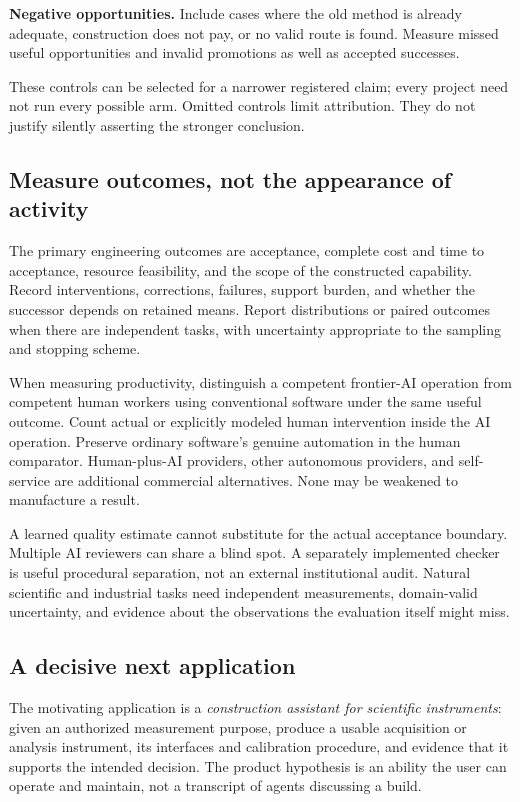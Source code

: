 \textbf{Negative opportunities.} Include cases where the old method is already adequate, construction does not pay, or no valid route is found. Measure missed useful opportunities and invalid promotions as well as accepted successes.

These controls can be selected for a narrower registered claim; every project need not run every possible arm. Omitted controls limit attribution. They do not justify silently asserting the stronger conclusion.

\subsection{Measure outcomes, not the appearance of activity}

The primary engineering outcomes are acceptance, complete cost and time to acceptance, resource feasibility, and the scope of the constructed capability. Record interventions, corrections, failures, support burden, and whether the successor depends on retained means. Report distributions or paired outcomes when there are independent tasks, with uncertainty appropriate to the sampling and stopping scheme.

When measuring productivity, distinguish a competent frontier-AI operation from competent human workers using conventional software under the same useful outcome. Count actual or explicitly modeled human intervention inside the AI operation. Preserve ordinary software's genuine automation in the human comparator. Human-plus-AI providers, other autonomous providers, and self-service are additional commercial alternatives. None may be weakened to manufacture a result.

A learned quality estimate cannot substitute for the actual acceptance boundary. Multiple AI reviewers can share a blind spot. A separately implemented checker is useful procedural separation, not an external institutional audit. Natural scientific and industrial tasks need independent measurements, domain-valid uncertainty, and evidence about the observations the evaluation itself might miss.

\subsection{A decisive next application}

The motivating application is a \emph{construction assistant for scientific instruments}: given an authorized measurement purpose, produce a usable acquisition or analysis instrument, its interfaces and calibration procedure, and evidence that it supports the intended decision. The product hypothesis is an ability the user can operate and maintain, not a transcript of agents discussing a build.


